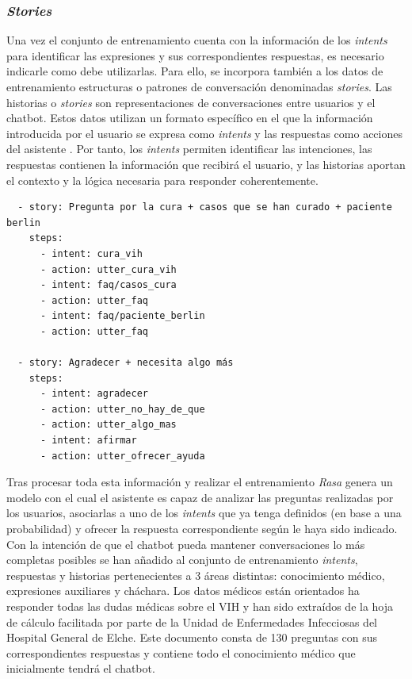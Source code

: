 \subsubsection{\textit{Stories}}
Una vez el conjunto de entrenamiento cuenta con la información de los \textit{intents} para identificar las expresiones y sus correspondientes respuestas, es necesario indicarle como debe utilizarlas. Para ello, se incorpora también a los datos de entrenamiento estructuras o patrones de conversación denominadas \textit{stories}. Las historias o \textit{stories} son representaciones de conversaciones entre usuarios y el chatbot. Estos datos utilizan un formato específico en el que la información introducida por el usuario se expresa como \textit{intents} y las respuestas como acciones del asistente \cite{rasaStories}. Por tanto, los \textit{intents} permiten identificar las intenciones, las respuestas contienen la información que recibirá el usuario, y las historias aportan el contexto y la lógica necesaria para responder coherentemente.\\

\begin{verbatim}
  - story: Pregunta por la cura + casos que se han curado + paciente berlin
    steps:
      - intent: cura_vih
      - action: utter_cura_vih
      - intent: faq/casos_cura
      - action: utter_faq
      - intent: faq/paciente_berlin
      - action: utter_faq

  - story: Agradecer + necesita algo más
    steps:
      - intent: agradecer
      - action: utter_no_hay_de_que
      - action: utter_algo_mas
      - intent: afirmar
      - action: utter_ofrecer_ayuda
\end{verbatim}

Tras procesar toda esta información y realizar el entrenamiento \textit{Rasa} genera un modelo con el cual el asistente es capaz de analizar las preguntas realizadas por los usuarios, asociarlas a uno de los \textit{intents} que ya tenga definidos (en base a una probabilidad) y ofrecer la respuesta correspondiente según le haya sido indicado.\\

Con la intención de que el chatbot pueda mantener conversaciones lo más completas posibles se han añadido al conjunto de entrenamiento \textit{intents}, respuestas y historias pertenecientes a 3 áreas distintas: conocimiento médico, expresiones auxiliares y cháchara. Los datos médicos están orientados ha responder todas las dudas médicas sobre el VIH y han sido extraídos de la hoja de cálculo facilitada por parte de la Unidad de Enfermedades Infecciosas del Hospital General de Elche. Este documento consta de 130 preguntas con sus correspondientes respuestas y contiene todo el conocimiento médico que inicialmente tendrá el chatbot.\\

